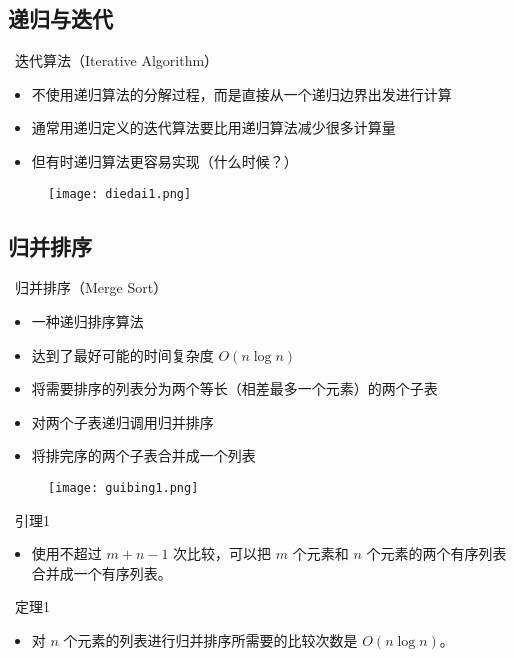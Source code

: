 \documentclass[UTF8]{report}
\theoremstyle{MyLineTheoremStyle} %
\theoremstyle{MyBlockTheoremStyle} %
\theoremstyle{MySubsubsectionStyle} %
\begin{document}
\subsection{递归与迭代}

\textbullet\ 迭代算法（Iterative Algorithm）
\begin{itemize}
    \item 不使用递归算法的分解过程，而是直接从一个递归边界出发进行计算
    \item 通常用递归定义的迭代算法要比用递归算法减少很多计算量
    \item 但有时递归算法更容易实现（什么时候？）
\end{itemize}

\begin{figure}[H]
    \centering
    \texttt{[image: diedai1.png]}
\end{figure}

\subsection{归并排序}

\textbullet\ 归并排序（Merge Sort）
\begin{itemize}
    \item 一种递归排序算法
    \item 达到了最好可能的时间复杂度 $O(n \log n)$
    \item 将需要排序的列表分为两个等长（相差最多一个元素）的两个子表
    \item 对两个子表递归调用归并排序
    \item 将排完序的两个子表合并成一个列表
\end{itemize}

\begin{figure}[H]
    \centering
    \texttt{[image: guibing1.png]}
\end{figure}

\textbullet\ 引理1
\begin{itemize}
    \item 使用不超过 $m + n - 1$ 次比较，可以把 $m$ 个元素和 $n$ 个元素的两个有序列表合并成一个有序列表。
\end{itemize}

\textbullet\ 定理1
\begin{itemize}
    \item 对 $n$ 个元素的列表进行归并排序所需要的比较次数是 $O(n \log n)$。
\end{itemize}
\end{document}
